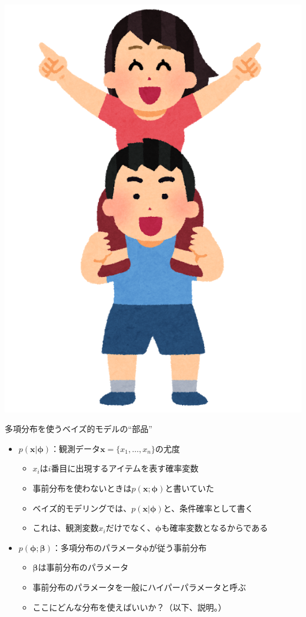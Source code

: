 \documentclass[aspectratio=169,unicode,dvipdfmx,14pt]{beamer}
\begin{document}
\begin{frame}
\begin{textblock*}{0.4\linewidth}
    \includegraphics[width=0.7\linewidth]{kataguruma_live_couple}
\end{textblock*}
\end{frame}


\begin{frame}{多項分布を使うベイズ的モデルの``部品''}
\begin{itemize}
\item $p(\bm{x}|\bm{\phi})$：観測データ$\bm{x}=\{x_1,\ldots,x_n\}$の尤度
\begin{itemize}
\item $x_i$は$i$番目に出現するアイテムを表す確率変数
\item 事前分布を使わないときは$p(\bm{x};\bm{\phi})$と書いていた
\item ベイズ的モデリングでは、$p(\bm{x}|\bm{\phi})$と、条件確率として書く
\item これは、観測変数$x_i$だけでなく、$\bm{\phi}$も確率変数となるからである
\end{itemize}
\item $p(\bm{\phi};\bm{\beta})$：多項分布のパラメータ$\bm{\phi}$が従う事前分布
\begin{itemize}
\item $\bm{\beta}$は事前分布のパラメータ
\item 事前分布のパラメータを一般にハイパーパラメータと呼ぶ
\item ここにどんな分布を使えばいいか？（以下、説明。）
\end{itemize}
\end{itemize}
\end{frame}
\end{document}

